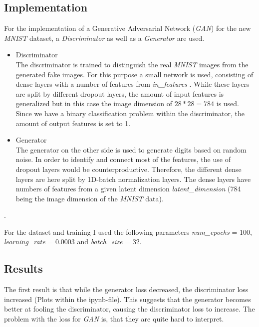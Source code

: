 

\setlength{\parindent}{0em}



\subsection{Implementation}
For the implementation of a Generative Adversarial Network (\textit{GAN}) for the new \textit{MNIST} dataset, a \textit{Discriminator} as well as a \textit{Generator} are used.
\begin{itemize}
  \item Discriminator\\
  The discriminator is trained to distinguish the real \textit{MNIST} images from the generated fake images. 
  For this purpose a small network is used, consisting of dense layers with a number of features from \textit{in\_features}    .
  While these layers are split by different dropout layers, the amount of input features is generalized but in this case the image dimension of $28 * 28 =784$ is used.
  Since we have a binary classification problem within the discriminator, the amount of output features is set to 1.
  \item Generator\\
  The generator on the other side is used to generate digits based on random noise. In order to identify and connect most of the features, the use of dropout layers would be counterproductive.
  Therefore, the different dense layers are here split by 1D-batch normalization layers.
  The dense layers have numbers of features from a given latent dimension \textit{latent\_dimension}     (784 being the image dimension of the \textit{MNIST} data).
\end{itemize}.

For the dataset and training I used the following parameters \textit{num\_epochs} = 100, \textit{learning\_rate} = $0.0003$ and \textit{batch\_size} = 32.

\subsection{Results}
The first result is that while the generator loss decreased, the discriminator loss increased (Plots within the ipynb-file).
This suggests that the generator becomes better at fooling the discriminator, causing the discriminator loss to increase.
The problem with the loss for \textit{GAN} is, that they are quite hard to interpret.\\

